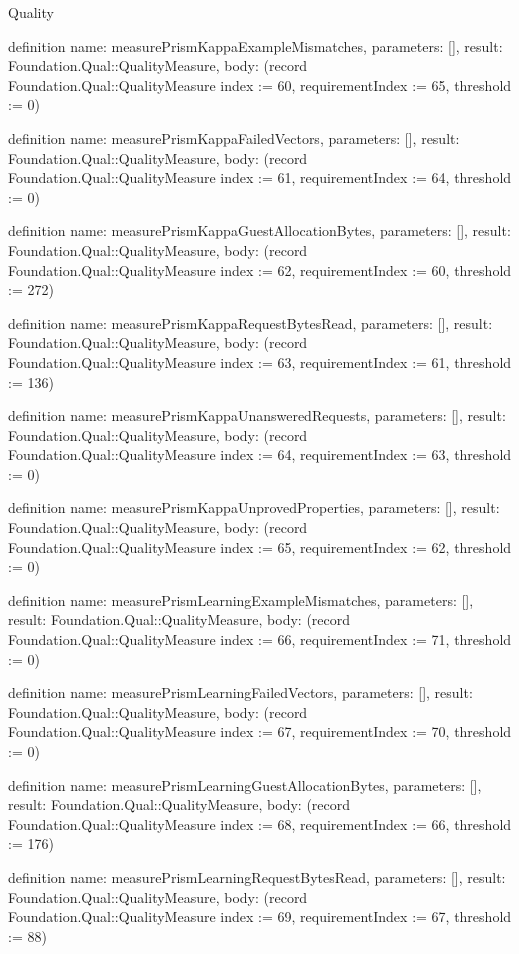 \begin{lexlean}{Quality}
\begin{semanticmodule}
definition{
  name: measurePrismKappaExampleMismatches,
  parameters: [],
  result: Foundation.Qual::QualityMeasure,
  body: (record Foundation.Qual::QualityMeasure {index := 60, requirementIndex := 65, threshold := 0})
}

definition{
  name: measurePrismKappaFailedVectors,
  parameters: [],
  result: Foundation.Qual::QualityMeasure,
  body: (record Foundation.Qual::QualityMeasure {index := 61, requirementIndex := 64, threshold := 0})
}

definition{
  name: measurePrismKappaGuestAllocationBytes,
  parameters: [],
  result: Foundation.Qual::QualityMeasure,
  body: (record Foundation.Qual::QualityMeasure {index := 62, requirementIndex := 60, threshold := 272})
}

definition{
  name: measurePrismKappaRequestBytesRead,
  parameters: [],
  result: Foundation.Qual::QualityMeasure,
  body: (record Foundation.Qual::QualityMeasure {index := 63, requirementIndex := 61, threshold := 136})
}

definition{
  name: measurePrismKappaUnansweredRequests,
  parameters: [],
  result: Foundation.Qual::QualityMeasure,
  body: (record Foundation.Qual::QualityMeasure {index := 64, requirementIndex := 63, threshold := 0})
}

definition{
  name: measurePrismKappaUnprovedProperties,
  parameters: [],
  result: Foundation.Qual::QualityMeasure,
  body: (record Foundation.Qual::QualityMeasure {index := 65, requirementIndex := 62, threshold := 0})
}

definition{
  name: measurePrismLearningExampleMismatches,
  parameters: [],
  result: Foundation.Qual::QualityMeasure,
  body: (record Foundation.Qual::QualityMeasure {index := 66, requirementIndex := 71, threshold := 0})
}

definition{
  name: measurePrismLearningFailedVectors,
  parameters: [],
  result: Foundation.Qual::QualityMeasure,
  body: (record Foundation.Qual::QualityMeasure {index := 67, requirementIndex := 70, threshold := 0})
}

definition{
  name: measurePrismLearningGuestAllocationBytes,
  parameters: [],
  result: Foundation.Qual::QualityMeasure,
  body: (record Foundation.Qual::QualityMeasure {index := 68, requirementIndex := 66, threshold := 176})
}

definition{
  name: measurePrismLearningRequestBytesRead,
  parameters: [],
  result: Foundation.Qual::QualityMeasure,
  body: (record Foundation.Qual::QualityMeasure {index := 69, requirementIndex := 67, threshold := 88})
}


\end{semanticmodule}
\end{lexlean}
